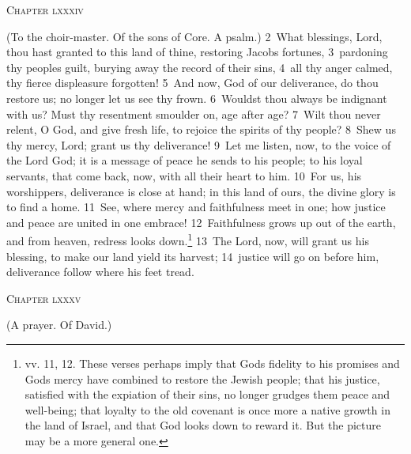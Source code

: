 \documentclass[10pt]{book} %
\begin{document}
\begin{large}\begin{center}\textsc{Chapter lxxxiv}\end{center}\end{large}
(To the choir-master. Of the sons of Core. A psalm.)
\textcolor{benred8}{2}~What blessings, Lord, thou hast granted to this land of thine, restoring Jacob\textquotesingle s fortunes, \textcolor{benred8}{3}~pardoning thy people\textquotesingle s guilt, burying away the record of their sins, \textcolor{benred8}{4}~all thy anger calmed, thy fierce displeasure forgotten! \textcolor{benred8}{5}~And now, God of our deliverance, do thou restore us; no longer let us see thy frown. \textcolor{benred8}{6}~Wouldst thou always be indignant with us? Must thy resentment smoulder on, age after age? \textcolor{benred8}{7}~Wilt thou never relent, O God, and give fresh life, to rejoice the spirits of thy people? \textcolor{benred8}{8}~Shew us thy mercy, Lord; grant us thy deliverance!
\textcolor{benred8}{9}~Let me listen, now, to the voice of the Lord God; it is a message of peace he sends to his people; to his loyal servants, that come back, now, with all their heart to him. \textcolor{benred8}{10}~For us, his worshippers, deliverance is close at hand; in this land of ours, the divine glory is to find a home. \textcolor{benred8}{11}~See, where mercy and faithfulness meet in one; how justice and peace are united in one embrace! \textcolor{benred8}{12}~Faithfulness grows up out of the earth, and from heaven, redress looks down.\footnote[1]{vv. 11, 12. These verses perhaps imply that God\textquotesingle s fidelity to his promises and God\textquotesingle s mercy have combined to restore the Jewish people; that his justice, satisfied with the expiation of their sins, no longer grudges them peace and well-being; that loyalty to the old covenant is once more a native growth in the land of Israel, and that God looks down to reward it. But the picture may be a more general one.} \textcolor{benred8}{13}~The Lord, now, will grant us his blessing, to make our land yield its harvest; \textcolor{benred8}{14}~justice will go on before him, deliverance follow where his feet tread.
\begin{large}\begin{center}\textsc{Chapter lxxxv}\end{center}\end{large}
(A prayer. Of David.)
\end{document}
